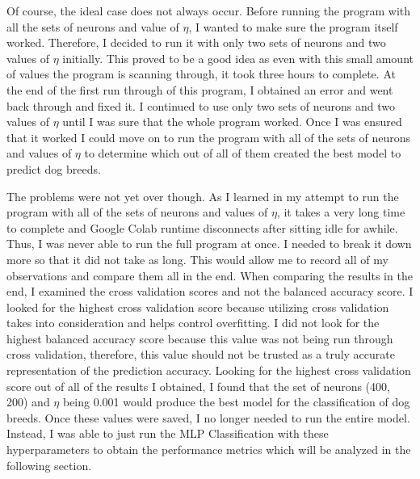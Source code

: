 \documentclass[12pt]{article}
\begin{document}
Of course, the ideal case does not always occur.  Before running the program with all the sets of neurons and value of $\eta$, I wanted to make sure the program itself worked.  Therefore, I decided to run it with only two sets of neurons and two values of $\eta$ initially.  This proved to be a good idea as even with this small amount of values the program is scanning through, it took three hours to complete.  At the end of the first run through of this program, I obtained an error and went back through and fixed it.  I continued to use only two sets of neurons and two values of $\eta$ until I was sure that the whole program worked.  Once I was ensured that it worked I could move on to run the program with all of the sets of neurons and values of $\eta$ to determine which out of all of them created the best model to predict dog breeds.

The problems were not yet over though.  As I learned in my attempt to run the program with all of the sets of neurons and values of $\eta$, it takes a very long time to complete and Google Colab runtime disconnects after sitting idle for awhile.  Thus, I was never able to run the full program at once.  I needed to break it down more so that it did not take as long.  This would allow me to record all of my observations and compare them all in the end.  When comparing the results in the end, I examined the cross validation scores and not the balanced accuracy score.  I looked for the highest cross validation score because utilizing cross validation takes into consideration and helps control overfitting.  I did not look for the highest balanced accuracy score because this value was not being run through cross validation, therefore, this value should not be trusted as a truly accurate representation of the prediction accuracy.  Looking for the highest cross validation score out of all of the results I obtained, I found that the set of neurons (400, 200) and $\eta$ being 0.001 would produce the best model for the classification of dog breeds.  Once these values were saved, I no longer needed to run the entire model.  Instead, I was able to just run the MLP Classification with these hyperparameters to obtain the performance metrics which will be analyzed in the following section.
\end{document}
